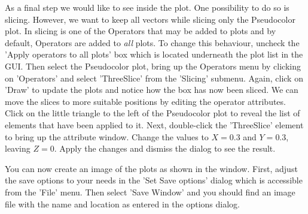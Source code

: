 As a final step we would like to see inside the plot. One possibility to do so
is slicing. However, we want to keep all vectors while slicing only the
Pseudocolor plot. In \VisIt slicing is one of the Operators that may be added
to plots and by default, Operators are added to \emph{all} plots.
To change this behaviour, uncheck the 'Apply operators to all plots' box which
is located underneath the plot list in the GUI.
Then select the Pseudocolor plot, bring up the Operators menu by clicking on
'Operators' and select 'ThreeSlice' from the 'Slicing' submenu.
Again, click on 'Draw' to update the plots and notice how the box has now been
sliced. We can move the slices to more suitable positions by editing the
operator attributes. Click on the little triangle to the left of the
Pseudocolor plot to reveal the list of elements that have been applied to it.
Next, double-click the 'ThreeSlice' element to bring up the attribute window.
Change the values to $X=0.3$ and $Y=0.3$, leaving $Z=0$. Apply the changes and
dismiss the dialog to see the result.

You can now create an image of the plots as shown in the window. First, adjust
the save options to your needs in the 'Set Save options' dialog which is
accessible from the 'File' menu. Then select 'Save Window' and you should find
an image file with the name and location as entered in the options dialog.

